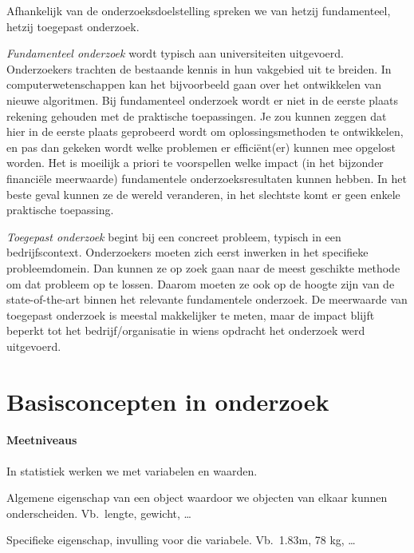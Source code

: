 Afhankelijk van de onderzoeksdoelstelling spreken we van hetzij fundamenteel, hetzij toegepast onderzoek.

\emph{Fundamenteel onderzoek} wordt typisch aan universiteiten uitgevoerd. Onderzoekers trachten de bestaande kennis in hun vakgebied uit te breiden. In computerwetenschappen kan het bijvoorbeeld gaan over het ontwikkelen van nieuwe algoritmen. Bij fundamenteel onderzoek wordt er niet in de eerste plaats rekening gehouden met de praktische toepassingen. Je zou kunnen zeggen dat hier in de eerste plaats geprobeerd wordt om oplossingsmethoden te ontwikkelen, en pas dan gekeken wordt welke problemen er efficiënt(er) kunnen mee opgelost worden. Het is moeilijk a priori te voorspellen welke impact (in het bijzonder financiële meerwaarde) fundamentele onderzoeksresultaten kunnen hebben. In het beste geval kunnen ze de wereld veranderen, in het slechtste komt er geen enkele praktische toepassing.

\emph{Toegepast onderzoek} begint bij een concreet probleem, typisch in een bedrijfscontext. Onderzoekers moeten zich eerst inwerken in het specifieke probleemdomein. Dan kunnen ze op zoek gaan naar de meest geschikte methode om dat probleem op te lossen. Daarom moeten ze ook op de hoogte zijn van de state-of-the-art binnen het relevante fundamentele onderzoek. De meerwaarde van toegepast onderzoek is meestal makkelijker te meten, maar de impact blijft beperkt tot het bedrijf/organisatie in wiens opdracht het onderzoek werd uitgevoerd.

\section{Basisconcepten in onderzoek}

\paragraph{Meetniveaus}

In statistiek werken we met variabelen en waarden.

\begin{definition}[Variabele] 
    Algemene eigenschap van een object waardoor we objecten van elkaar kunnen onderscheiden. Vb.~lengte, gewicht, \ldots
\end{definition}  
\begin{definition}[Waarde]
    Specifieke eigenschap, invulling voor die variabele. Vb.~1.83m, 78 kg, \ldots
\end{definition}

